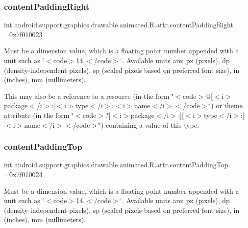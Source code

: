 \subsubsection{\texorpdfstring{content\+Padding\+Right}{contentPaddingRight}}
{\footnotesize\ttfamily int android.\+support.\+graphics.\+drawable.\+animated.\+R.\+attr.\+content\+Padding\+Right =0x7f010023\hspace{0.3cm}{\ttfamily [static]}}

Must be a dimension value, which is a floating point number appended with a unit such as \char`\"{}$<$code$>$14.\+5sp$<$/code$>$\char`\"{}. Available units are\+: px (pixels), dp (density-\/independent pixels), sp (scaled pixels based on preferred font size), in (inches), mm (millimeters). 

This may also be a reference to a resource (in the form \char`\"{}$<$code$>$@\mbox{[}$<$i$>$package$<$/i$>$\+:\mbox{]}$<$i$>$type$<$/i$>$\+:$<$i$>$name$<$/i$>$$<$/code$>$\char`\"{}) or theme attribute (in the form \char`\"{}$<$code$>$?\mbox{[}$<$i$>$package$<$/i$>$\+:\mbox{]}\mbox{[}$<$i$>$type$<$/i$>$\+:\mbox{]}$<$i$>$name$<$/i$>$$<$/code$>$\char`\"{}) containing a value of this type. \mbox{\label{classandroid_1_1support_1_1graphics_1_1drawable_1_1animated_1_1R_1_1attr_afcfea466a3b636a3a5e31bf35460c01a}} 
\subsubsection{\texorpdfstring{content\+Padding\+Top}{contentPaddingTop}}
{\footnotesize\ttfamily int android.\+support.\+graphics.\+drawable.\+animated.\+R.\+attr.\+content\+Padding\+Top =0x7f010024\hspace{0.3cm}{\ttfamily [static]}}

Must be a dimension value, which is a floating point number appended with a unit such as \char`\"{}$<$code$>$14.\+5sp$<$/code$>$\char`\"{}. Available units are\+: px (pixels), dp (density-\/independent pixels), sp (scaled pixels based on preferred font size), in (inches), mm (millimeters). 

